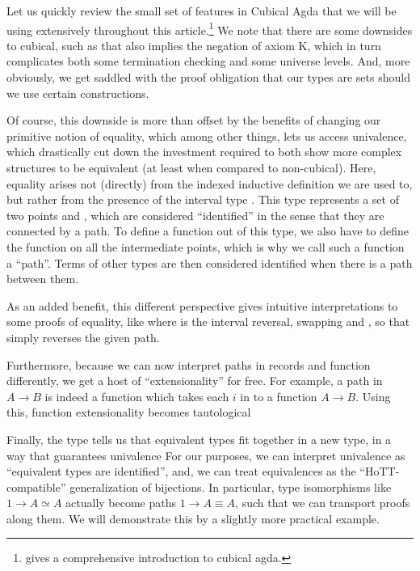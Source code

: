 Let us quickly review the small set of features in Cubical Agda that we will be using extensively throughout this article.\footnote{\cite{cuagda} gives a comprehensive introduction to cubical agda.} We note that there are some downsides to cubical, such as that
also implies the negation of axiom K, which in turn complicates both some termination checking and some universe levels. And, more obviously, we get saddled with the proof obligation that our types are sets should we use certain constructions.

Of course, this downside is more than offset by the benefits of changing our primitive notion of equality, which among other things, lets us access univalence, which drastically cut down the investment required to both show more complex structures to be equivalent (at least when compared to non-cubical). Here, equality arises not (directly) from the indexed inductive definition we are used to, but rather from the presence of the interval type . This type represents a set of two points  and , which are considered ``identified'' in the sense that they are connected by a path. To define a function out of this type, we also have to define the function on all the intermediate points, which is why we call such a function a ``path''. Terms of other types are then considered identified when there is a path between them.

As an added benefit, this different perspective gives intuitive interpretations to some proofs of equality, like
where  is the interval reversal, swapping  and , so that  simply reverses the given path.

Furthermore, because we can now interpret paths in records and function differently, we get a host of ``extensionality'' for free. For example, a path in $A \to B$ is indeed a function which takes each $i$ in  to a function $A \to B$. Using this, function extensionality becomes tautological 

Finally, the  type tells us that equivalent types fit together in a new type, in a way that guarantees univalence
For our purposes, we can interpret univalence as ``equivalent types are identified'', and, we can treat equivalences as the ``HoTT-compatible'' generalization of bijections. In particular, type isomorphisms like $1 \to A \simeq A$ actually become paths $1 \to A \equiv A$, such that we can transport proofs along them. We will demonstrate this by a slightly more practical example.


